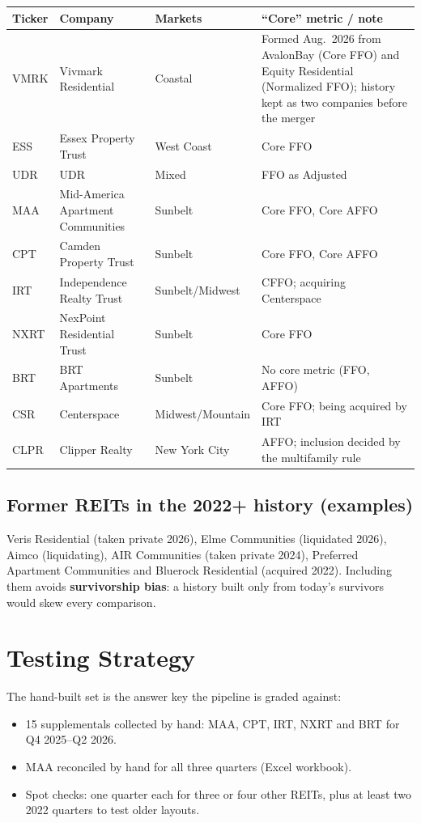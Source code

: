 \documentclass[11pt]{article}
\begin{document}
{\small\noindent
\begin{tabularx}{\textwidth}{@{}l >{\raggedright\arraybackslash}p{3.9cm} >{\raggedright\arraybackslash}p{3.0cm} L@{}}
\toprule
\textbf{Ticker} & \textbf{Company} & \textbf{Markets} & \textbf{``Core'' metric / note} \\
\midrule
VMRK & Vivmark Residential & Coastal & Formed Aug.\ 2026 from AvalonBay (Core FFO) and Equity Residential (Normalized FFO); history kept as two companies before the merger \\
ESS  & Essex Property Trust & West Coast & Core FFO \\
UDR  & UDR & Mixed & FFO as Adjusted \\
MAA  & Mid-America Apartment Communities & Sunbelt & Core FFO, Core AFFO \\
CPT  & Camden Property Trust & Sunbelt & Core FFO, Core AFFO \\
IRT  & Independence Realty Trust & Sunbelt/Midwest & CFFO; acquiring Centerspace \\
NXRT & NexPoint Residential Trust & Sunbelt & Core FFO \\
BRT  & BRT Apartments & Sunbelt & No core metric (FFO, AFFO) \\
CSR  & Centerspace & Midwest/Mountain & Core FFO; being acquired by IRT \\
CLPR & Clipper Realty & New York City & AFFO; inclusion decided by the multifamily rule \\
\bottomrule
\end{tabularx}}

\subsection*{Former REITs in the 2022+ history (examples)}
Veris Residential (taken private 2026), Elme Communities (liquidated 2026),
Aimco (liquidating), AIR Communities (taken private 2024), Preferred Apartment
Communities and Bluerock Residential (acquired 2022). Including them avoids
\textbf{survivorship bias}: a history built only from today's survivors would
skew every comparison.

\section{Testing Strategy}

The hand-built set is the answer key the pipeline is graded against:
\begin{itemize}[itemsep=1pt]
  \item 15 supplementals collected by hand: MAA, CPT, IRT, NXRT and BRT for
        Q4 2025--Q2 2026.
  \item MAA reconciled by hand for all three quarters (Excel workbook).
  \item Spot checks: one quarter each for three or four other REITs, plus at
        least two 2022 quarters to test older layouts.
\end{itemize}
\end{document}
